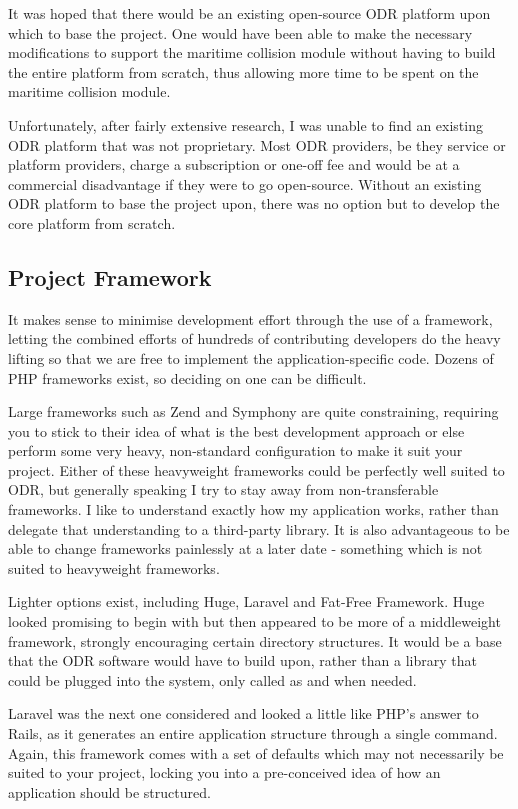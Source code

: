 It was hoped that there would be an existing open-source ODR platform upon which to base the project. One would have been able to make the necessary modifications to support the maritime collision module without having to build the entire platform from scratch, thus allowing more time to be spent on the maritime collision module.

Unfortunately, after fairly extensive research, I was unable to find an existing ODR platform that was not proprietary. Most ODR providers, be they service or platform providers, charge a subscription or one-off fee and would be at a commercial disadvantage if they were to go open-source. Without an existing ODR platform to base the project upon, there was no option but to develop the core platform from scratch.

\subsection{Project Framework}\label{subsection:framework}

It makes sense to minimise development effort through the use of a framework, letting the combined efforts of hundreds of contributing developers do the heavy lifting so that we are free to implement the application-specific code. Dozens of PHP frameworks exist, so deciding on one can be difficult.

Large frameworks such as Zend and Symphony are quite constraining, requiring you to stick to their idea of what is the best development approach or else perform some very heavy, non-standard configuration to make it suit your project. Either of these heavyweight frameworks could be perfectly well suited to ODR, but generally speaking I try to stay away from non-transferable frameworks. I like to understand exactly how my application works, rather than delegate that understanding to a third-party library. It is also advantageous to be able to change frameworks painlessly at a later date - something which is not suited to heavyweight frameworks.

Lighter options exist, including Huge, Laravel and Fat-Free Framework. Huge looked promising to begin with but then appeared to be more of a middleweight framework, strongly encouraging certain directory structures. It would be a base that the ODR software would have to build upon, rather than a library that could be plugged into the system, only called as and when needed.

Laravel was the next one considered and looked a little like PHP's answer to Rails, as it generates an entire application structure through a single command. Again, this framework comes with a set of defaults which may not necessarily be suited to your project, locking you into a pre-conceived idea of how an application should be structured.

